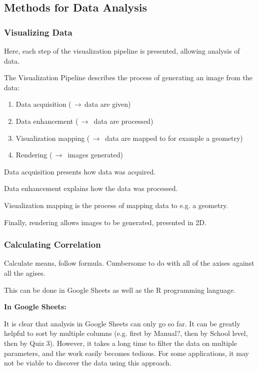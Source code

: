 \subsection{Methods for Data Analysis}

\subsubsection{Visualizing Data}

Here, each step of the visualization pipeline is presented, allowing analysis of data.

The Visualization Pipeline describes the process of generating an image from the data: \cite{timo-ropinski-liu}

\begin{enumerate}
\item Data acquisition ($\,\to\,$data are given)
\item Data enhancement ($\,\to\,$ data are processed)
\item Visualization mapping ($\,\to\,$ data are mapped to for example a geometry)
\item Rendering ($\,\to\,$ images generated)
\end{enumerate}


Data acquisition presents how data was acquired.

Data enhancement explains how the data was processed.

Visualization mapping is the process of mapping data to e.g. a geometry.

Finally, rendering allows images to be generated, presented in 2D.

\subsubsection{Calculating Correlation}

Calculate means, follow formula. Cumbersome to do with all of the axises against all the agises.

This can be done in Google Sheets as well as the R programming language.

\textbf{In Google Sheets: }

It is clear that analysis in Google Sheets can only go so far. It can be greatly helpful to sort by multiple columns (e.g. first by Manual?, then by School level, then by Quiz 3). However, it takes a long time to filter the data on multiple parameters, and the work easily becomes tedious. For some applications, it may not be viable to discover the data using this approach.

